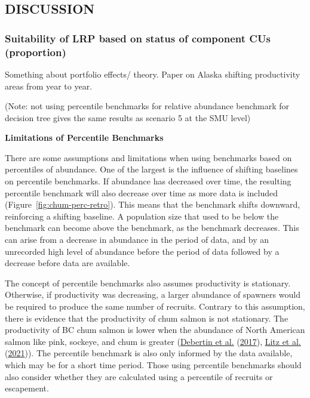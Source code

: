 \documentclass[11pt]{book}
\begin{document}
\hypertarget{discussion-2}{%
\subsection{DISCUSSION}\label{discussion-2}}

\hypertarget{suitability-of-lrp-based-on-status-of-component-cus-proportion}{%
\subsubsection{Suitability of LRP based on status of component CUs (proportion)}\label{suitability-of-lrp-based-on-status-of-component-cus-proportion}}

Something about portfolio effects/ theory. Paper on Alaska shifting productivity areas from year to year.

(Note: not using percentile benchmarks for relative abundance benchmark for decision tree gives the same results as scenario 5 at the SMU level)

\textbf{Limitations of Percentile Benchmarks}

There are some assumptions and limitations when using benchmarks based on percentiles of abundance. One of the largest is the influence of shifting baselines on percentile benchmarks. If abundance has decreased over time, the resulting percentile benchmark will also decrease over time as more data is included (Figure~\ref{fig:chum-perc-retro}). This means that the benchmark shifts downward, reinforcing a shifting baseline. A population size that used to be below the benchmark can become above the benchmark, as the benchmark decreases. This can arise from a decrease in abundance in the period of data, and by an unrecorded high level of abundance before the period of data followed by a decrease before data are available.

The concept of percentile benchmarks also assumes productivity is stationary. Otherwise, if productivity was decreasing, a larger abundance of spawners would be required to produce the same number of recruits. Contrary to this assumption, there is evidence that the productivity of chum salmon is not stationary. The productivity of BC chum salmon is lower when the abundance of North American salmon like pink, sockeye, and chum is greater (\protect\hyperlink{ref-debertinMarineGrowthPatterns2017}{Debertin et al.} (\protect\hyperlink{ref-debertinMarineGrowthPatterns2017}{2017}), \protect\hyperlink{ref-litzCompetitionOddyearPink2021}{Litz et al.} (\protect\hyperlink{ref-litzCompetitionOddyearPink2021}{2021})). The percentile benchmark is also only informed by the data available, which may be for a short time period. Those using percentile benchmarks should also consider whether they are calculated using a percentile of recruits or escapement.
\end{document}
